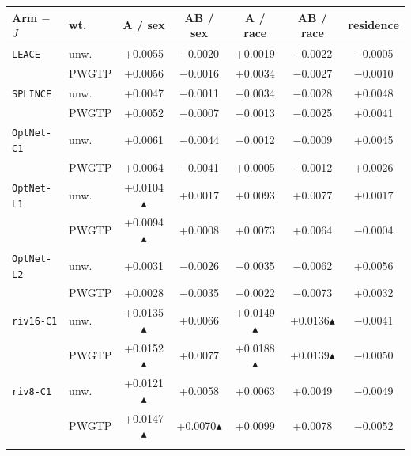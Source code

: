\begin{tabular}{@{}llccccc@{}}
\toprule
Arm $-$ $J$ & wt. & A / sex & AB / sex & A / race & AB / race & residence \\
\midrule
\texttt{LEACE} & unw. & +0.0055 & $-$0.0020 & +0.0019 & $-$0.0022 & $-$0.0005 \\
 & PWGTP & +0.0056 & $-$0.0016 & +0.0034 & $-$0.0027 & $-$0.0010 \\
\addlinespace[1pt]
\texttt{SPLINCE} & unw. & +0.0047 & $-$0.0011 & $-$0.0034 & $-$0.0028 & +0.0048 \\
 & PWGTP & +0.0052 & $-$0.0007 & $-$0.0013 & $-$0.0025 & +0.0041 \\
\addlinespace[1pt]
\texttt{OptNet-C1} & unw. & +0.0061 & $-$0.0044 & $-$0.0012 & $-$0.0009 & +0.0045 \\
 & PWGTP & +0.0064 & $-$0.0041 & +0.0005 & $-$0.0012 & +0.0026 \\
\addlinespace[1pt]
\texttt{OptNet-L1} & unw. & +0.0104$\blacktriangle$ & +0.0017 & +0.0093 & +0.0077 & +0.0017 \\
 & PWGTP & +0.0094$\blacktriangle$ & +0.0008 & +0.0073 & +0.0064 & $-$0.0004 \\
\addlinespace[1pt]
\texttt{OptNet-L2} & unw. & +0.0031 & $-$0.0026 & $-$0.0035 & $-$0.0062 & +0.0056 \\
 & PWGTP & +0.0028 & $-$0.0035 & $-$0.0022 & $-$0.0073 & +0.0032 \\
\addlinespace[1pt]
\texttt{riv16-C1} & unw. & +0.0135$\blacktriangle$ & +0.0066 & +0.0149$\blacktriangle$ & +0.0136$\blacktriangle$ & $-$0.0041 \\
 & PWGTP & +0.0152$\blacktriangle$ & +0.0077 & +0.0188$\blacktriangle$ & +0.0139$\blacktriangle$ & $-$0.0050 \\
\addlinespace[1pt]
\texttt{riv8-C1} & unw. & +0.0121$\blacktriangle$ & +0.0058 & +0.0063 & +0.0049 & $-$0.0049 \\
 & PWGTP & +0.0147$\blacktriangle$ & +0.0070$\blacktriangle$ & +0.0099 & +0.0078 & $-$0.0052 \\
\addlinespace[1pt]
\bottomrule
\end{tabular}
